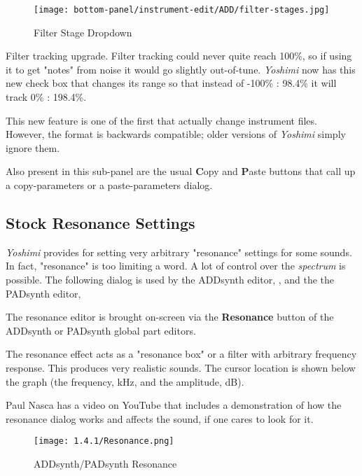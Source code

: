 \begin{figure}[H]
   \centering 
   \texttt{[image: bottom-panel/instrument-edit/ADD/filter-stages.jpg]}
   \caption[Filter Stage Dropdown]{Filter Stage Dropdown}
   \label{fig:filter_stage_dropdown} 
\end{figure}

   Filter tracking upgrade.
   Filter tracking could never quite reach 100\%,
   so if using it to get "notes" from noise it would go slightly out-of-tune.
   \textsl{Yoshimi} now has this new check box that changes its range so that
   instead of -100\% : 98.4\% it will track 0\% : 198.4\%.

   This new feature is one of the first that actually change instrument files.
   However, the format is backwards compatible; older versions of
   \textsl{Yoshimi} simply ignore them.

   Also present in this sub-panel are the usual \textbf{C}opy
   and \textbf{P}aste buttons that call up a copy-parameters or
   a paste-parameters dialog.

\subsection{Stock Resonance Settings}
\label{subsec:stock_resonance_settings}

   \textsl{Yoshimi} provides for setting very arbitrary "resonance"
   settings for some sounds.  In fact, "resonance" is too limiting a word.
   A lot of control over the \textsl{spectrum} is possible.
   The following dialog is used by
   the ADDsynth editor,
   , and the
   the PADsynth editor,

   The resonance editor is brought on-screen via the
   \textbf{Resonance} button of the ADDsynth or PADsynth
   global part editors.

   The resonance effect acts as a "resonance box" or a filter with arbitrary
   frequency response. This produces very realistic sounds. 
   The cursor location is shown below the graph (the frequency, kHz, and
   the amplitude, dB). 

   Paul Nasca has a video on YouTube that includes a demonstration of how
   the resonance dialog works and affects the sound, if one cares to look for
   it.

\begin{figure}[H]
   \centering 
   \texttt{[image: 1.4.1/Resonance.png]}
   \caption{ADDsynth/PADsynth Resonance}
   \label{fig:addsynth_resonance}
\end{figure}

